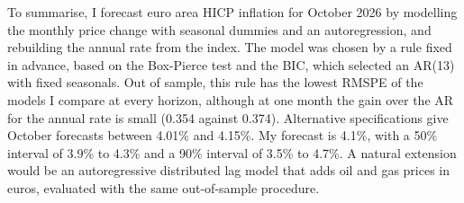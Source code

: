 \documentclass[11pt]{article}
\begin{document}
To summarise, I forecast euro area HICP inflation for October 2026 by modelling the monthly price change with seasonal dummies and an autoregression, and rebuilding the annual rate from the index. The model was chosen by a rule fixed in advance, based on the Box-Pierce test and the BIC, which selected an AR(13) with fixed seasonals. Out of sample, this rule has the lowest RMSPE of the models I compare at every horizon, although at one month the gain over the AR for the annual rate is small (0.354 against 0.374). Alternative specifications give October forecasts between 4.01\% and 4.15\%. My forecast is 4.1\%, with a 50\% interval of 3.9\% to 4.3\% and a 90\% interval of 3.5\% to 4.7\%. A natural extension would be an autoregressive distributed lag model that adds oil and gas prices in euros, evaluated with the same out-of-sample procedure.

\end{document}
